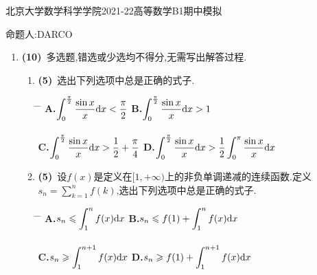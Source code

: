 \documentclass{ctexart}
\begin{document}
\pagestyle{empty}
\begin{center}\Large
    北京大学数学科学学院2021-22高等数学B1期中模拟
\end{center}
\begin{center}\large 命题人:DARCO\end{center}
\begin{enumerate}[leftmargin=*,label=\textbf{\arabic*.}]
    \item \textbf{(10)}\ 多选题,错选或少选均不得分,无需写出解答过程.
        \begin{enumerate}[label=\textbf{(\arabic*)}]
            \item \textbf{(5)}\ 选出下列选项中总是正确的式子.
                \begin{tabbing}
                    \hspace{0pt} \= \hspace{225pt} \= \hspace{225pt} \kill
                    \> \textbf{A.}$\displaystyle\int_0^{\frac{\pi}{2}}\dfrac{\sin x}{x}\mathrm{d} x<\dfrac{\pi}{2}$
                    \> \textbf{B.}$\displaystyle\int_0^{\frac{\pi}{2}}\dfrac{\sin x}{x}\mathrm{d} x>1$ \\\ \\
                    \> \textbf{C.}$\displaystyle\int_0^{\frac{\pi}{2}}\dfrac{\sin x}{x}\mathrm{d} x>\dfrac{1}{2}+\dfrac{\pi}{4}$
                    \> \textbf{D.}$\displaystyle\int_0^{\frac{\pi}{2}}\dfrac{\sin x}{x}\mathrm{d} x>\dfrac{1}{2}\displaystyle\int_0^{\pi}\dfrac{\sin x}{x}\mathrm{d} x$
                \end{tabbing}
            \item \textbf{(5)}\ 设$f(x)$是定义在$[1,+\infty)$上的非负单调递减的连续函数.定义$\displaystyle s_n=\sum_{k=1}^nf(k)$,选出下列选项中总是正确的式子.
                \begin{tabbing}
                    \hspace{0pt} \= \hspace{225pt} \= \hspace{225pt} \kill
                    \> \textbf{A.}$\displaystyle s_n\leqslant\int_1^nf(x)\mathrm{d} x$
                    \> \textbf{B.}$\displaystyle s_n\leqslant f(1)+\int_1^nf(x)\mathrm{d} x$ \\\ \\
                    \> \textbf{C.}$\displaystyle s_n\geqslant\int_1^{n+1}f(x)\mathrm{d} x$
                    \> \textbf{D.}$\displaystyle s_n\geqslant f(1)+\int_1^{n+1}f(x)\mathrm{d} x$
                \end{tabbing}
        \end{enumerate}

\end{enumerate}
\end{document}
